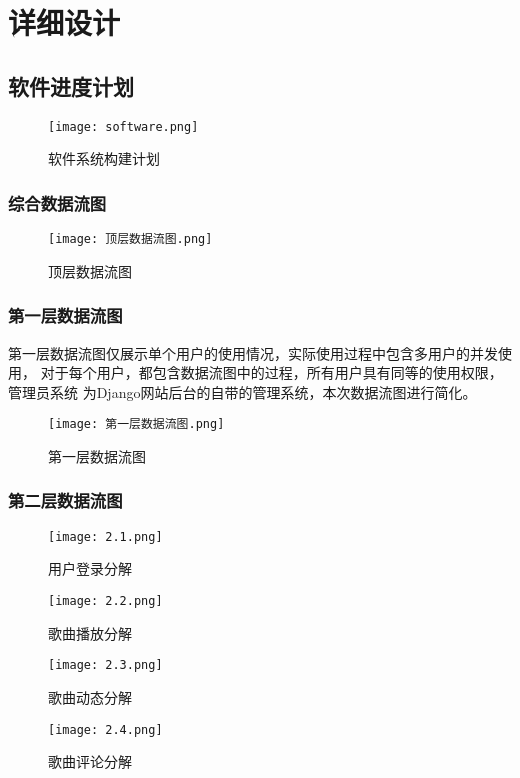 \documentclass[UTF8,14pt]{article}
\numberwithin{figure}{subsubsection}
\numberwithin{table}{subsubsection}
\begin{document}
\section{详细设计}
\subsection{软件进度计划}
\begin{figure}[H]
	\centering
	\texttt{[image: software.png]}
	\caption{软件系统构建计划}
\end{figure}

\clearpage
\subsubsection{综合数据流图}
\begin{figure}[H]
	\centering
	\texttt{[image: 顶层数据流图.png]}
	\caption{顶层数据流图}
\end{figure}
\subsubsection{第一层数据流图}
第一层数据流图仅展示单个用户的使用情况，实际使用过程中包含多用户的并发使用，
对于每个用户，都包含数据流图中的过程，所有用户具有同等的使用权限，管理员系统
为Django网站后台的自带的管理系统，本次数据流图进行简化。
\begin{figure}[H]
	\centering
	\texttt{[image: 第一层数据流图.png]}
	\caption{第一层数据流图}
\end{figure}
\subsubsection{第二层数据流图}
\begin{figure}[H]
	\centering
	\texttt{[image: 2.1.png]}
	\caption{用户登录分解}
\end{figure}
\begin{figure}[H]
	\centering
	\texttt{[image: 2.2.png]}
	\caption{歌曲播放分解}
\end{figure}
\begin{figure}[H]
	\centering
	\texttt{[image: 2.3.png]}
	\caption{歌曲动态分解}
\end{figure}
\begin{figure}[H]
	\centering
	\texttt{[image: 2.4.png]}
	\caption{歌曲评论分解}
\end{figure}
\end{document}
